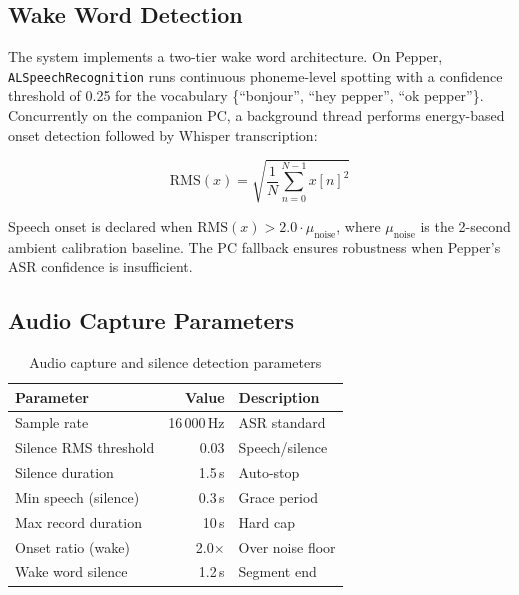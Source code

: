 \documentclass[a4paper]{article}
\begin{document}
\subsection{Wake Word Detection}

The system implements a two-tier wake word architecture. On Pepper, \texttt{ALSpeechRecognition} runs continuous phoneme-level spotting with a confidence threshold of 0.25 for the vocabulary \{``bonjour'', ``hey pepper'', ``ok pepper''\}. Concurrently on the companion PC, a background thread performs energy-based onset detection followed by Whisper transcription:

\begin{equation}
  \text{RMS}(x) = \sqrt{\frac{1}{N}\sum_{n=0}^{N-1} x[n]^2}
  \label{eq:rms}
\end{equation}

Speech onset is declared when $\text{RMS}(x) > 2.0 \cdot \mu_{\text{noise}}$, where $\mu_{\text{noise}}$ is the 2-second ambient calibration baseline. The PC fallback ensures robustness when Pepper's ASR confidence is insufficient.

\subsection{Audio Capture Parameters}

\begin{table}[th]
  \caption{Audio capture and silence detection parameters}
  \label{tab:audio_params}
  \centering
  \small
  \begin{tabular}{p{26mm}rp{20mm}}
    \toprule
    \textbf{Parameter} & \textbf{Value} & \textbf{Description} \\
    \midrule
    Sample rate            & 16\,000\,Hz & ASR standard \\
    Silence RMS threshold  & 0.03        & Speech/silence \\
    Silence duration       & 1.5\,s      & Auto-stop \\
    Min speech (silence)   & 0.3\,s      & Grace period \\
    Max record duration    & 10\,s       & Hard cap \\
    Onset ratio (wake)     & 2.0$\times$ & Over noise floor \\
    Wake word silence      & 1.2\,s      & Segment end \\
    \bottomrule
  \end{tabular}
\end{table}
\end{document}
